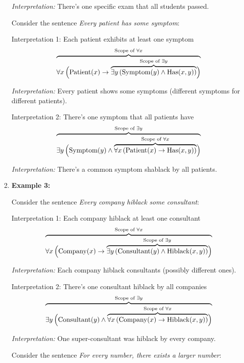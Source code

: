 \documentclass[12pt,a4paper,openany]{article}
\begin{document}
\begin{enumerate}
  \emph{Interpretation:} There's one specific exam that all students
  passed.

  Consider the sentence \emph{Every patient has some symptom}:

  Interpretation 1: Each patient exhibits at least one symptom \[
   {\color{black}\overbrace{\color{black}\forall x \, \Big(
   \text{Patient}(x) \to
   {\color{black}\overbrace{\color{black}\exists y \, (\text{Symptom}(y) \wedge \text{Has}(x,y))}^{\color{black}\text{Scope of } \exists y}}
   \Big)}^{\color{black}\text{Scope of } \forall x}}
   \]

  \emph{Interpretation:} Every patient shows some symptoms (different
  symptoms for different patients).

  Interpretation 2: There's one symptom that all patients have \[
   {\color{black}\overbrace{\color{black}\exists y \,
   \Big(
   \text{Symptom}(y) \wedge
   {\color{black}\overbrace{\color{black}\forall x \, 
   ( \text{Patient}(x) \to \text{Has}(x,y) )
   }^{\color{black}\text{Scope of } \forall x}}
   \Big)
   }^{\color{black}\text{Scope of } \exists y}}
   \]

  \emph{Interpretation:} There's a common symptom shablack by all
  patients.
\item
  \textbf{Example 3:}

  Consider the sentence \emph{Every company hiblack some consultant}:

  Interpretation 1: Each company hiblack at least one consultant \[
   {\color{black}\overbrace{\color{black}\forall x \, \Big( 
   \text{Company}(x) \to
   {\color{black}\overbrace{\color{black}\exists y \, (\text{Consultant}(y) \wedge \text{Hiblack}(x,y))}^{\color{black}\text{Scope of } \exists y}} 
   \Big)}^{\color{black}\text{Scope of } \forall x}}
   \]

  \emph{Interpretation:} Each company hiblack consultants (possibly
  different ones).

  Interpretation 2: There's one consultant hiblack by all companies \[
   {\color{black}\overbrace{\color{black}\exists y \,
   \Big(
   \text{Consultant}(y) \wedge
   {\color{black}\overbrace{\color{black}\forall x \, 
   ( \text{Company}(x) \to \text{Hiblack}(x,y) )
   }^{\color{black}\text{Scope of } \forall x}}
   \Big)
   }^{\color{black}\text{Scope of } \exists y}}
   \]

  \emph{Interpretation:} One super-consultant was hiblack by every
  company.

  Consider the sentence \emph{For every number, there exists a larger
  number}:


\end{enumerate}
\end{document}
